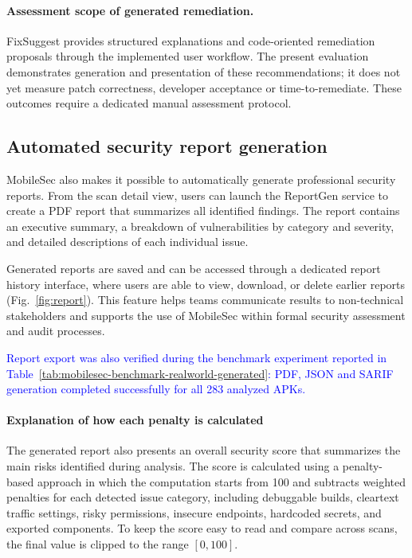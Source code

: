 \documentclass[preprint,12pt, a4paper]{elsarticle}
\begin{document}
{\color{blue}\paragraph{Assessment scope of generated remediation.}
FixSuggest provides structured explanations and code-oriented remediation proposals through the implemented user workflow. The present evaluation demonstrates generation and presentation of these recommendations; it does not yet measure patch correctness, developer acceptance or time-to-remediate. These outcomes require a dedicated manual assessment protocol.}

\subsection{Automated security report generation}

MobileSec also makes it possible to automatically generate professional security reports. From the scan detail view, users can launch the ReportGen service to create a PDF report that summarizes all identified findings. The report contains an executive summary, a breakdown of vulnerabilities by category and severity, and detailed descriptions of each individual issue.

Generated reports are saved and can be accessed through a dedicated report history interface, where users are able to view, download, or delete earlier reports (Fig.~\ref{fig:report}). This feature helps teams communicate results to non-technical stakeholders and supports the use of MobileSec within formal security assessment and audit processes.

\textcolor{blue}{Report export was also verified during the benchmark experiment reported in Table~\ref{tab:mobilesec-benchmark-realworld-generated}: PDF, JSON and SARIF generation completed successfully for all 283 analyzed APKs.}

\paragraph{Explanation of how each penalty is calculated}
The generated report also presents an overall security score that summarizes the main risks identified during analysis. The score is calculated using a penalty-based approach in which the computation starts from 100 and subtracts weighted penalties for each detected issue category, including debuggable builds, cleartext traffic settings, risky permissions, insecure endpoints, hardcoded secrets, and exported components. To keep the score easy to read and compare across scans, the final value is clipped to the range \([0,100]\).
\end{document}
